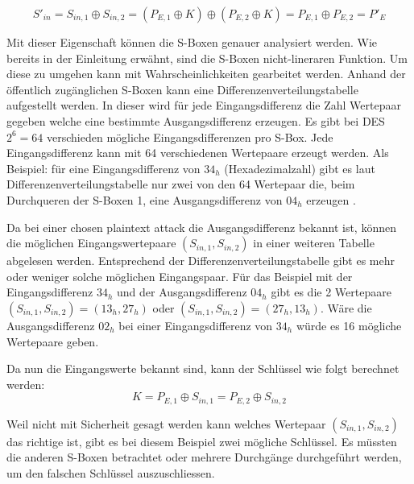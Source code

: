 \begin{equation}\label{equ:Schluessel_Differenz}
S'_{in} = S_{in,1} \oplus S_{in,2} = (P_{E,1} \oplus K) \oplus (P_{E,2} \oplus K) = P_{E,1} \oplus P_{E,2} = P'_{E} 
\end{equation}


Mit dieser Eigenschaft können die S-Boxen genauer analysiert werden. 
Wie bereits in der Einleitung erwähnt, sind die S-Boxen nicht-lineraren Funktion. Um diese zu umgehen kann mit Wahrscheinlichkeiten gearbeitet werden.
Anhand der öffentlich zugänglichen S-Boxen kann eine Differenzenverteilungstabelle aufgestellt werden. In dieser wird für jede Eingangsdifferenz die Zahl Wertepaar gegeben welche eine bestimmte Ausgangsdifferenz erzeugen. 
Es gibt bei DES $2^{6} = 64$ verschieden mögliche Eingangsdifferenzen pro S-Box. Jede Eingangsdifferenz kann mit 64 verschiedenen Wertepaare erzeugt werden. Als Beispiel: für eine Eingangsdifferenz von $34_{h}$ (Hexadezimalzahl) gibt es laut Differenzenverteilungstabelle nur zwei von den 64 Wertepaar die, beim Durchqueren der S-Boxen 1, eine Ausgangsdifferenz von $04_{h}$ erzeugen \cite{noauthor_differenzielle_2019}\cite{biham_differential_1990}. 

Da bei einer chosen plaintext attack die Ausgangsdifferenz bekannt ist, können die möglichen Eingangswertepaare $(S_{in,1}, S_{in,2})$ in einer weiteren Tabelle abgelesen werden. Entsprechend der Differenzenverteilungstabelle gibt es mehr oder weniger solche möglichen Eingangspaar.
Für das Beispiel mit der Eingangsdifferenz $34_{h}$ und der Ausgangsdifferenz $04_{h}$ gibt es die 2 Wertepaare $(S_{in,1}, S_{in,2}) = (13_{h}, 27_{h})$ oder $(S_{in,1},S_{in,2}) = (27_{h}, 13_{h})$. Wäre die Ausgangsdifferenz $02_{h}$ bei einer Eingangsdifferenz von $34_{h}$ würde es 16 mögliche Wertepaare geben. 

Da nun die Eingangswerte bekannt sind, kann der Schlüssel wie folgt berechnet werden:
\begin{equation}\label{equ:Schluessel_Loesung}
K = P_{E,1} \oplus S_{in,1} = P_{E,2} \oplus S_{in,2}
\end{equation}

Weil nicht mit Sicherheit gesagt werden kann welches Wertepaar $(S_{in,1}, S_{in,2})$ das richtige ist, gibt es bei diesem Beispiel zwei mögliche Schlüssel. Es müssten die anderen S-Boxen betrachtet oder mehrere Durchgänge durchgeführt werden, um den falschen Schlüssel auszuschliessen. 















